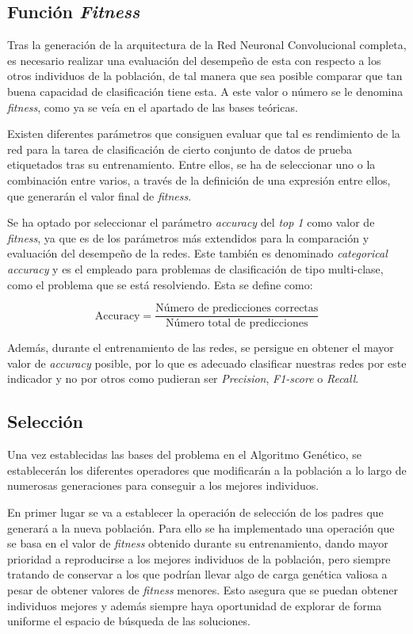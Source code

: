 \subsection{Función \textit{Fitness}}

Tras la generación de la arquitectura de la Red Neuronal Convolucional completa, es necesario realizar una evaluación del desempeño de esta con respecto a los otros individuos de la población, de tal manera que sea posible comparar que tan buena capacidad de clasificación tiene esta. A este valor o número se le denomina \textit{fitness}, como ya se veía en el apartado de las bases teóricas.

Existen diferentes parámetros que consiguen evaluar que tal es rendimiento de la red para la tarea de clasificación de cierto conjunto de datos de prueba etiquetados tras su entrenamiento. Entre ellos, se ha de seleccionar uno o la combinación entre varios, a través de la definición de una expresión entre ellos, que generarán el valor final de \textit{fitness}.

Se ha optado por seleccionar el parámetro \textit{accuracy} del \textit{top 1} como valor de \textit{fitness}, ya que es de los parámetros más extendidos para la comparación y evaluación del desempeño de la redes. Este también es denominado \textit{categorical accuracy} y es el empleado para problemas de clasificación de tipo multi-clase, como el problema que se está resolviendo. Esta se define como:

\begin{equation}
    \text{Accuracy} = \frac{\text{Número de predicciones correctas}}{\text{Número total de predicciones}}
\end{equation}

Además, durante el entrenamiento de las redes, se persigue en obtener el mayor valor de \textit{accuracy} posible, por lo que es adecuado clasificar nuestras redes por este indicador y no por otros como pudieran ser \textit{Precision}, \textit{F1-score} o \textit{Recall}.

\subsection{Selección}

Una vez establecidas las bases del problema en el Algoritmo Genético, se establecerán los diferentes operadores que modificarán a la población a lo largo de numerosas generaciones para conseguir a los mejores individuos.

En primer lugar se va a establecer la operación de selección de los padres que generará a la nueva población. Para ello se ha implementado una operación que se basa en el valor de \textit{fitness} obtenido durante su entrenamiento, dando mayor prioridad a reproducirse a los mejores individuos de la población, pero siempre tratando de conservar a los que podrían llevar algo de carga genética valiosa a pesar de obtener valores de \textit{fitness} menores. Esto asegura que se puedan obtener individuos mejores y además siempre haya oportunidad de explorar de forma uniforme el espacio de búsqueda de las soluciones.

